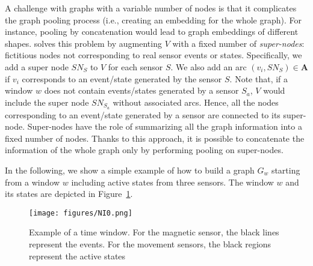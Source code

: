 A challenge with graphs with a variable number of nodes is that it complicates the graph pooling process (i.e., creating an embedding for the whole graph).
For instance, pooling by concatenation would lead to graph embeddings of different shapes. 
%
\acronym{} solves this problem by augmenting $V$ with a fixed number of \textit{super-nodes}: fictitious nodes not corresponding to real sensor events or states. 
Specifically, we add a super node $SN_S$ to $V$ for each sensor $S$. We also add an arc $(v_i, SN_S)\in \mathbf{A}$ if $v_i$ corresponds to an event/state generated by the sensor $S$. Note that, if a window $w$ does not contain events/states generated by a sensor $S_a$, $V$ would include the super node $SN_{S_a}$ without associated arcs.
Hence, all the nodes corresponding to an event/state generated by a sensor are connected to its super-node. 
Super-nodes have the role of summarizing all the graph information into a fixed number of nodes. Thanks to this approach, it is possible to concatenate the information of the whole graph only by performing pooling on super-nodes.

In the following, we show a simple example of how to build a graph $G_w$ starting from a window $w$ including active states from three sensors.
The window $w$ and its states are depicted in Figure~\ref{fig:EX1}.

\begin{figure}
    \centering
    \texttt{[image: figures/NI0.png]}
    \caption[Graph construction example 1]{Example of a time window. For the magnetic sensor, the black lines represent the events. For the movement sensors, the black regions represent the active states}
    \label{fig:EX1}
\end{figure}


